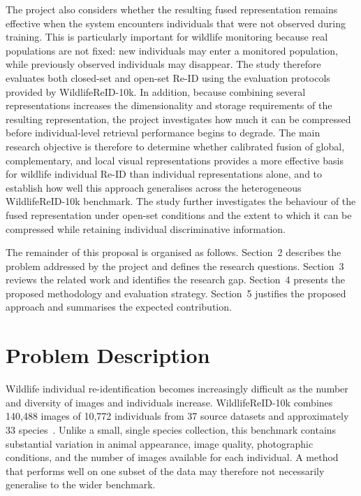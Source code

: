 \documentclass[runningheads]{llncs}
\begin{document}
The project also considers whether the resulting fused representation remains
effective when the system encounters individuals that were not observed during
training. This is particularly important for wildlife monitoring because real
populations are not fixed: new individuals may enter a monitored population,
while previously observed individuals may disappear. The study therefore
evaluates both closed-set and open-set Re-ID using the evaluation protocols
provided by WildlifeReID-10k. In addition, because combining several
representations increases the dimensionality and storage requirements of the
resulting representation, the project investigates how much it can be
compressed before individual-level retrieval performance begins to degrade.
The main research objective is therefore to determine whether calibrated
fusion of global, complementary, and local visual representations provides a
more effective basis for wildlife individual Re-ID than individual
representations alone, and to establish how well this approach generalises
across the heterogeneous WildlifeReID-10k benchmark. The study further
investigates the behaviour of the fused representation under open-set
conditions and the extent to which it can be compressed while retaining
individual discriminative information.

The remainder of this proposal is organised as follows. Section~2 describes
the problem addressed by the project and defines the research questions.
Section~3 reviews the related work and identifies the research gap. Section~4
presents the proposed methodology and evaluation strategy. Section~5
justifies the proposed approach and summarises the expected contribution.

\section{Problem Description}

Wildlife individual re-identification becomes increasingly difficult as the
number and diversity of images and individuals increase. WildlifeReID-10k
combines 140,488 images of 10,772 individuals from 37 source datasets and approximately
33 species~\cite{adam2025wildlifereid}. Unlike a small, single species
collection, this benchmark contains substantial variation in animal
appearance, image quality, photographic conditions, and the number of images
available for each individual. A method that performs well on one subset of
the data may therefore not necessarily generalise to the wider benchmark.
\end{document}
